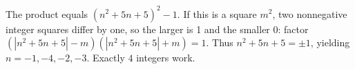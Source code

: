 The product equals $(n^2+5n+5)^2-1$. If this is a square $m^2$, two nonnegative integer squares differ by one, so the larger is 1 and the smaller 0: factor $(|n^2+5n+5|-m)(|n^2+5n+5|+m)=1$. Thus $n^2+5n+5=\pm1$, yielding $n=-1,-4,-2,-3$. Exactly $\boxed4$ integers work.
